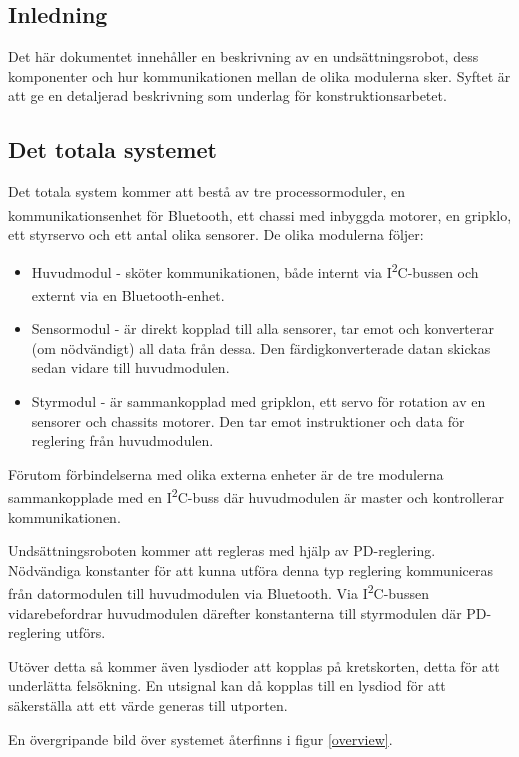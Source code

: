 \documentclass[11pt]{article}
\begin{document}
\begin{flushleft}
\section{Inledning}
Det här dokumentet innehåller en beskrivning av en undsättningsrobot, dess komponenter och hur kommunikationen mellan de olika modulerna sker. Syftet är att ge en detaljerad beskrivning som underlag för konstruktionsarbetet.

\subsection{Det totala systemet}
Det totala system kommer att bestå av tre processormoduler, en kommunikationsenhet för  Bluetooth\textsuperscript{\circledR}, ett chassi med inbyggda motorer, en gripklo, ett styrservo och ett antal olika sensorer. De olika modulerna följer:
\begin{itemize}
	\item Huvudmodul - sköter kommunikationen, både internt via I\textsuperscript{2}C-bussen och externt via en Bluetooth\textsuperscript{\circledR}-enhet.
	\item Sensormodul - är direkt kopplad till alla sensorer, tar emot och konverterar (om nödvändigt) all data från dessa. Den färdigkonverterade datan skickas sedan vidare till huvudmodulen.
	\item Styrmodul - är sammankopplad med gripklon, ett servo för rotation av en sensorer och chassits motorer. Den tar emot instruktioner och data för reglering från huvudmodulen.
\end{itemize}
Förutom förbindelserna med olika externa enheter är de tre modulerna sammankopplade med en I\textsuperscript{2}C-buss där huvudmodulen är master och kontrollerar kommunikationen. 

Undsättningsroboten kommer att regleras med hjälp av PD-reglering. Nödvändiga konstanter för att kunna utföra denna typ reglering kommuniceras från datormodulen till huvudmodulen via Bluetooth\textsuperscript{\circledR}. Via I\textsuperscript{2}C-bussen vidarebefordrar huvudmodulen därefter konstanterna till styrmodulen där PD-reglering utförs. 

Utöver detta så kommer även lysdioder att kopplas på kretskorten, detta för att underlätta felsökning. En utsignal kan då kopplas till en lysdiod för att säkerställa att ett värde generas till utporten.

En övergripande bild över systemet återfinns i figur \ref{overview}.


\end{flushleft}
\end{document}
